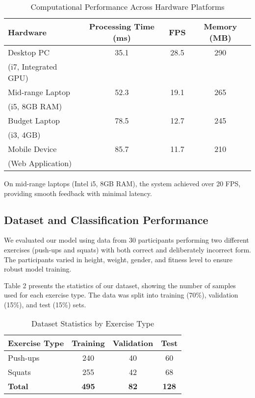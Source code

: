 \documentclass[11pt]{article}
\begin{document}
\begin{table}[h]
\caption{Computational Performance Across Hardware Platforms}
\begin{center}
\begin{tabular}{|l|c|c|c|}
\hline
\textbf{Hardware} & \textbf{Processing Time (ms)} & \textbf{FPS} & \textbf{Memory (MB)} \\
\hline
Desktop PC & 35.1 & 28.5 & 290 \\
(i7, Integrated GPU) & & & \\
\hline
Mid-range Laptop & 52.3 & 19.1 & 265 \\
(i5, 8GB RAM) & & & \\
\hline
Budget Laptop & 78.5 & 12.7 & 245 \\
(i3, 4GB) & & & \\
\hline
Mobile Device & 85.7 & 11.7 & 210 \\
(Web Application) & & & \\
\hline
\end{tabular}
\label{tab:performance}
\end{center}
\end{table}

On mid-range laptops (Intel i5, 8GB RAM), the system achieved over 20 FPS, providing smooth feedback with minimal latency.

\subsection{Dataset and Classification Performance}
We evaluated our model using data from 30 participants performing two different exercises (push-ups and squats) with both correct and deliberately incorrect form. The participants varied in height, weight, gender, and fitness level to ensure robust model training.

Table 2 presents the statistics of our dataset, showing the number of samples used for each exercise type. The data was split into training (70\%), validation (15\%), and test (15\%) sets.

\begin{table}[h]
\caption{Dataset Statistics by Exercise Type}
\begin{center}
\begin{tabular}{|l|c|c|c|}
\hline
\textbf{Exercise Type} & \textbf{Training} & \textbf{Validation} & \textbf{Test} \\
\hline
Push-ups & 240 & 40 & 60 \\
\hline
Squats & 255 & 42 & 68 \\
\hline
\textbf{Total} & \textbf{495} & \textbf{82} & \textbf{128} \\
\hline
\end{tabular}
\label{tab:dataset}
\end{center}
\end{table}
\end{document}
